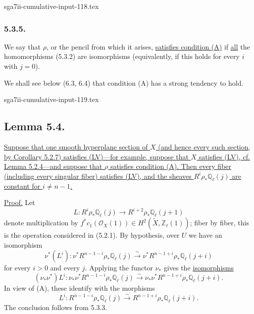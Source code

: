 \begin{filecontents*}{sga7ii-cumulative-input-118.tex}
\subsubsection*{5.3.5.}
We say that $\rho$, or the pencil from which it arises,
\underline{satisfies condition (A)} if \underline{all} the homomorphisms
(5.3.2) are isomorphisms (equivalently, if this holds for every $i$ with
$j=0$).

We shall see below (6.3, 6.4) that condition (A) has a strong tendency to
hold.
\end{filecontents*}
\begin{filecontents*}{sga7ii-cumulative-input-119.tex}
\subsection*{Lemma 5.4.}
\underline{Suppose that one smooth hyperplane section of $X$ (and hence
every such section, by Corollary 5.2.7) satisfies (LV)---for example, suppose
that $X$ satisfies (LV), cf. Lemma 5.2.4---and suppose that $\rho$ satisfies
condition (A).  Then every fiber (including every singular fiber) satisfies
(LV), and the sheaves $R^i\rho_*\mathbb Q_\ell(j)$ are constant for
$i\neq n-1$.}

\underline{Proof.}
Let
\[
L:R^i\rho_*\mathbb Q_\ell(j)
\longrightarrow R^{i+2}\rho_*\mathbb Q_\ell(j+1)
\]
denote multiplication by
$f^*c_1(\mathcal O_X(1))\in
H^2(\widetilde X,\mathbb Z_\ell(1))$; fiber by fiber, this is the operation
considered in (5.2.1).  By hypothesis, over $U$ we have an isomorphism
\begin{equation}\tag{5.4.1}
\nu^*(L^i):
\nu^*R^{n-1-i}\rho_*\mathbb Q_\ell(j)
\overset{\sim}{\longrightarrow}
\nu^*R^{n-1+i}\rho_*\mathbb Q_\ell(j+i)
\end{equation}
for every $i>0$ and every $j$.  Applying the functor $\nu_*$ gives the
\underline{isomorphisms}
\begin{equation}\tag{5.4.2}
(\nu_*\nu^*)L^i:
\nu_*\nu^*R^{n-1-i}\rho_*\mathbb Q_\ell(j)
\overset{\sim}{\longrightarrow}
\nu_*\nu^*R^{n-1+i}\rho_*\mathbb Q_\ell(j+i).
\end{equation}
In view of (A), these identify with the morphisms
\begin{equation}\tag{5.4.3}
L^i:R^{n-1-i}\rho_*\mathbb Q_\ell(j)
\overset{\sim}{\longrightarrow}
R^{n-1+i}\rho_*\mathbb Q_\ell(j+i).
\end{equation}
The conclusion follows from 5.3.3.


\end{filecontents*}
